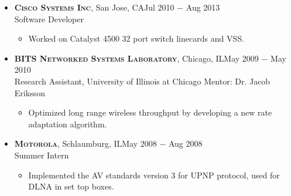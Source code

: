 \documentclass[10pt,oneside]{article}
\newcommand{\subheader}[1]{\textsc{\textbf{\large{#1}}}}
\begin{document}
\begin{itemize}
    \item
      \subheader{Cisco Systems Inc}, San Jose, CA\hfill Jul 2010 $-$ Aug 2013\\
      Software Developer
      \vspace{-4 pt}
      \begin{itemize}
          \item Worked on Catalyst 4500\textsuperscript{\textregistered} 32 port switch linecards and VSS.
      \end{itemize}

    \item
      \subheader{BITS Networked Systems Laboratory}, Chicago, IL\hfill May 2009 $-$ May 2010\\
      Research Assistant, University of Illinois at Chicago 
      Mentor: Dr. Jacob Eriksson
      \vspace{-4 pt}
	    \begin{itemize}
        \item Optimized long range wireless throughput by developing a new rate adaptation algorithm.
      \end{itemize}


    \item
      \subheader{Motorola}, Schlaumburg, IL\hfill May 2008 $-$ Aug 2008\\
      Summer Intern
      \vspace{-4 pt}
      \begin{itemize}
  	    \item Implemented the AV standards version 3 for UPNP protocol, used for DLNA in set top boxes.
      \end{itemize}
  \end{itemize}
\end{document}
